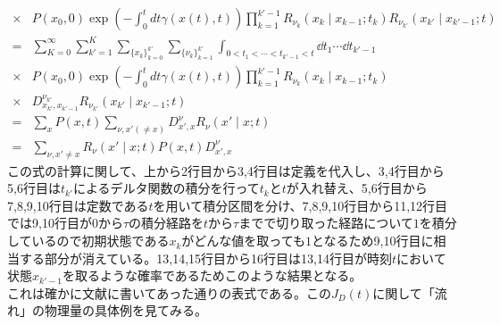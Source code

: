 \documentclass{ltjsarticle}
\begin{document}
\begin{align}
  \times&P(x_0,0)\exp\left(-\int_0^t dt\gamma\left(x(t),t\right)\right)\prod_{k=1}^{k'-1} R_{\nu_k}\left(x_k\mid x_{k-1};t_k\right)R_{\nu_{k'}}\left(x_{k'}\mid x_{k'-1};t\right)\\
  =&\sum_{K=0}^{\infty}\sum_{k'=1}^K\sum_{\lbrace x_k\rbrace_{k=0}^{k'}}\sum_{\lbrace\nu_k\rbrace_{k=1}^{k'}}\int_{0<t_1<\cdots<t_{k'-1}<t}\dd{t_1}\cdots\dd{t_{k'-1}} \\
  \times&P(x_0,0)\exp\left(-\int_0^t dt\gamma\left(x(t),t\right)\right)\prod_{k=1}^{k'-1} R_{\nu_k}\left(x_k\mid x_{k-1};t_k\right)\\
  \times&D^{\nu_{k'}}_{x_{k'},x_{k'-1}}R_{\nu_{k'}}\left(x_{k'}\mid x_{k'-1};t\right)\\
  =&\sum_{x}P(x,t)\sum_{\nu,x'(\neq x)}D^{\nu}_{x',x}R_{\nu}\left(x'\mid x;t\right)\\
  =&\sum_{\nu,x'\neq x}R_{\nu}\left(x'\mid x;t\right)P(x,t)D^{\nu}_{x',x}
\end{align}
この式の計算に関して、上から2行目から3,4行目は定義を代入し、3,4行目から5,6行目は$t_{k'}$によるデルタ関数の積分を行って$t_k$と$t$が入れ替え、5,6行目から7,8,9,10行目は定数である$t$を用いて積分区間を分け、7,8,9,10行目から11,12行目では9,10行目が$0$から$\tau$の積分経路を$t$から$\tau$までで切り取った経路について$1$を積分しているので初期状態である$x_k$がどんな値を取っても$1$となるため9,10行目に相当する部分が消えている。13,14,15行目から16行目は13,14行目が時刻$t$において状態$x_{k'-1}$を取るような確率であるためこのような結果となる。\\
これは確かに文献に書いてあった通りの表式である。この$J_D(t)$に関して「流れ」の物理量の具体例を見てみる。
\end{document}
